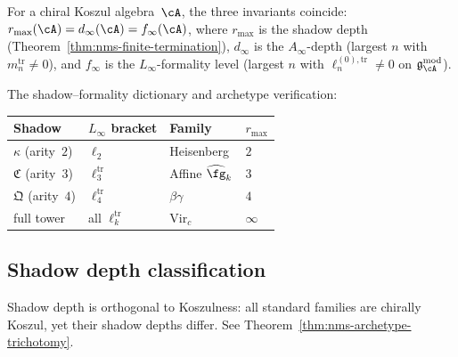 \begin{conjecture}
\label{conj:operadic-complexity}
For a chiral Koszul algebra~$\cA$, the three invariants
coincide: $r_{\max}(\cA) = d_\infty(\cA) = f_\infty(\cA)$,
where $r_{\max}$ is the shadow depth
(Theorem~\ref{thm:nms-finite-termination}), $d_\infty$ is
the $A_\infty$-depth (largest $n$ with $m_n^{\mathrm{tr}}
\neq 0$), and $f_\infty$ is the $L_\infty$-formality level
(largest $n$ with $\ell_n^{(0),\mathrm{tr}} \neq 0$ on
$\mathfrak{g}_\cA^{\mathrm{mod}}$).
\end{conjecture}

\noindent
The shadow--formality dictionary and archetype verification:

\begin{center}
\renewcommand{\arraystretch}{1.15}
\begin{tabular}{@{}llll@{}}
\toprule
\textbf{Shadow} & \textbf{$L_\infty$ bracket}
  & \textbf{Family} & $r_{\max}$ \\
\midrule
$\kappa$ (arity~$2$) & $\ell_2$
  & Heisenberg & $2$ \\
$\mathfrak{C}$ (arity~$3$) & $\ell_3^{\mathrm{tr}}$
  & Affine $\widehat{\fg}_k$ & $3$ \\
$\mathfrak{Q}$ (arity~$4$) & $\ell_4^{\mathrm{tr}}$
  & $\beta\gamma$ & $4$ \\
full tower & all $\ell_k^{\mathrm{tr}}$
  & $\mathrm{Vir}_c$ & $\infty$ \\
\bottomrule
\end{tabular}
\end{center}


\subsection{Shadow depth classification}
\label{subsec:concordance-shadow-depth-classes}

Shadow depth is orthogonal to Koszulness: all standard
families are chirally Koszul, yet their shadow depths differ.
See Theorem~\ref{thm:nms-archetype-trichotomy}.

